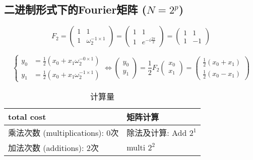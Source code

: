 \documentclass[12pt,a4paper]{article}
\numberwithin{subsection}{section}   %
\numberwithin{subsubsection}{subsection}
\theoremstyle{plain}
\theoremstyle{definition}
\theoremstyle{remark}
\theoremstyle{remark}
\begin{document}
	\subsection{ 二进制形式下的Fourier矩阵 ($N=2^p$)}
	
	\begin{equation}
		F_2 = \begin{pmatrix} 1 & 1 \\ 1 & \omega_2^{-1 \times 1} \end{pmatrix}
		= \begin{pmatrix} 1 & 1 \\ 1 & e^{-i \frac{2\pi}{2}} \end{pmatrix}
		= \begin{pmatrix} 1 & 1 \\ 1 & -1 \end{pmatrix}
	\end{equation}
	
	\begin{equation}
		\left\{
		\begin{aligned}
			y_0 &= \frac{1}{2}(x_0 + x_1 \omega_2^{-0 \times 1}) \\[8pt]
			y_1 &= \frac{1}{2}(x_0 + x_1 \omega_2^{-1 \times 1})
		\end{aligned}
		\right.
		\Leftrightarrow
		\begin{pmatrix} y_0 \\ y_1 \end{pmatrix}
		= \frac{1}{2} F_2 \begin{pmatrix} x_0 \\ x_1 \end{pmatrix}
		= \begin{pmatrix} \frac{1}{2}(x_0 + x_1) \\ \frac{1}{2}(x_0 - x_1) \end{pmatrix}
	\end{equation}
	
\begin{table}[h]
	\centering
	\caption{计算量}
	\begin{tabular}{|l|l|}
		\hline
		\textbf{total cost} & \textbf{矩阵计算} \\ \hline
		乘法次数 (multiplications): 0次 & 除法及计算: Add $2^1$ \\
		加法次数 (additions): 2次 & multi $2^2$ \\ \hline
	\end{tabular}
\end{table}
	
\end{document}
